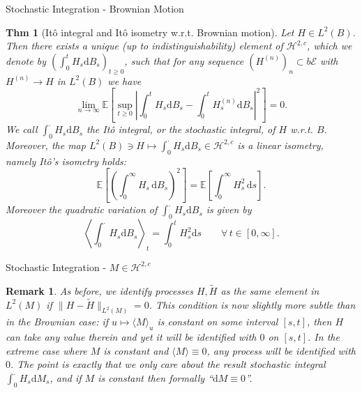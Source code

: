 \documentclass[a4paper]{article}
\theoremstyle{mytheoremstyle}
\newtheorem{theorem}{Thm}
\newtheorem*{remark}{Remark}
\newcommand{\1}{\mathds{1}}
\begin{document}
\begin{multicols*}{3}
\begin{roundbox}{Stochastic Integration - Brownian Motion}
\begin{theorem}[It{\^o} integral and It\^{o} isometry w.r.t. Brownian motion]
  \label{thm:ito-Bm}Let $H \in L^2 (B)$. Then there exists a unique (up to
  indistinguishability) element of $\mathcal{H}^{2, c}$, which we denote by
  $\left( \int_0^t H_s \mathrm{d} B_s \right)_{t \geqslant 0}$, such that for any
  sequence $(H^{(n)})_n \subset b\mathcal{E}$ with $H^{(n)} \rightarrow H$ in
  $L^2 (B)$ we have
  \[ \lim_{n \rightarrow \infty} \mathbb{E} \left[ \sup_{t \geqslant 0} \left|
     \int_0^t H_s \mathrm{d} B_s - \int_0^t H_s^{(n)} \mathrm{d} B_s \right|^2 \right]
     = 0. \]
  We call $\int_0^{\cdot} H_s \mathrm{d} B_s$ the {\emph{It{\^o} integral}}, or
  the {\emph{stochastic integral}}, of $H$ w.r.t. $B$. Moreover, the map $L^2
  (B) \ni H \mapsto \int_0^{\cdot} H_s \mathrm{d} B_s \in \mathcal{H}^{2, c}$ is
  a linear isometry, namely {\emph{It{\^o}'s isometry}} holds:
  \begin{equation}
    \mathbb{E} \left[ \left( \int_0^{\infty} H_s \, \mathrm{d} B_s \right)^2
    \right] =\mathbb{E} \left[ \int_0^{\infty} H_s^2 \, \mathrm{d} s \right] .
    \label{eq:ito.isometry.Bm}
  \end{equation}
  Moreover the quadratic variation of $\int_0^{\cdot} H_s \mathrm{d} B_s$ is
  given by
  \begin{equation}
    \left\langle \int_0^{\cdot} H_s \mathrm{d} B_s \right\rangle_t = \int_0^t
    H_s^2 \mathrm{d} s \qquad \forall \, t \in [0, \infty] .
    \label{eq:ito.isometry.quadratic.Bm}
  \end{equation}
\end{theorem}
\end{roundbox}

\begin{roundbox}{Stochastic Integration - $M \in \mathcal{H}^{2, c}$}
\begin{remark}
  As before, we identify processes $H, \tilde{H}$ as the same element in $L^2
  (M)$ if $\| H - \tilde{H} \|_{L^2 (M)} = 0$. This condition is now slightly
  more subtle than in the Brownian case: if ${u \mapsto \langle M \rangle_u} $
  is constant on some interval $[s, t]$, then $H$ can take any value therein
  and yet it will be identified with $0$ on $[s, t]$. In the extreme case
  where $M$ is constant and $\langle M \rangle \equiv 0$, any process will be
  identified with $0$. The point is exactly that we only care about the result
  stochastic integral $\int_0^{\cdot} H_s \mathrm{d} M_s$, and if $M$ is constant
  then formally ``$\mathrm{d} M \equiv 0$''. 
\end{remark}


\end{roundbox}
\end{multicols*}
\end{document}
